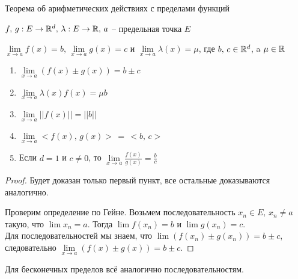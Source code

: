 \begin{theorem-non}
    Теорема об арифметических действиях с пределами функций

    $f, \, g : E \to \mathbb{R}^d, \, \lambda : E \to \mathbb{R}, \, a$ -- предельная точка $E$

    $\lim\limits_{x \to a} f(x) = b, \, \lim\limits_{x \to a} g(x) = c$ и $\lim\limits_{x \to a} \lambda(x) = \mu$, где $b, \, c \in \mathbb{R}^d$, a $\mu \in \mathbb{R}$
    \begin{enumerate}
        \item $\lim\limits_{x \to a} (f(x) \pm g(x)) = b \pm c$
        \item $\lim\limits_{x \to a} \lambda(x)f(x) = \mu b$
        \item $\lim\limits_{x \to a} ||f(x)|| = ||b||$
        \item $\lim\limits_{x \to a} <f(x), \, g(x)> \, = \, <b, \, c>$
        \item Если $d = 1$ и $c \neq 0$, то $\lim\limits_{x \to a} \frac{f(x)}{g(x)} = \frac{b}{c}$
    \end{enumerate}
\end{theorem-non}
\begin{proof}
    Будет доказан только первый пункт, все остальные доказываются аналогично.

    Проверим определение по Гейне. Возьмем последовательность $x_n \in E, \, x_n \neq a$ такую, что $\lim x_n = a$.
    Тогда $\lim f(x_n) = b$ и $\lim g(x_n) = c$. \\
    Для последовательностей мы знаем, что $\lim (f(x_n) \pm g(x_n)) = b \pm c$, следовательно $\lim\limits_{x \to a} (f(x) \pm g(x)) = b \pm c$.
\end{proof}
\begin{notice}
    Для бесконечных пределов всё аналогично последовательностям.
\end{notice}

